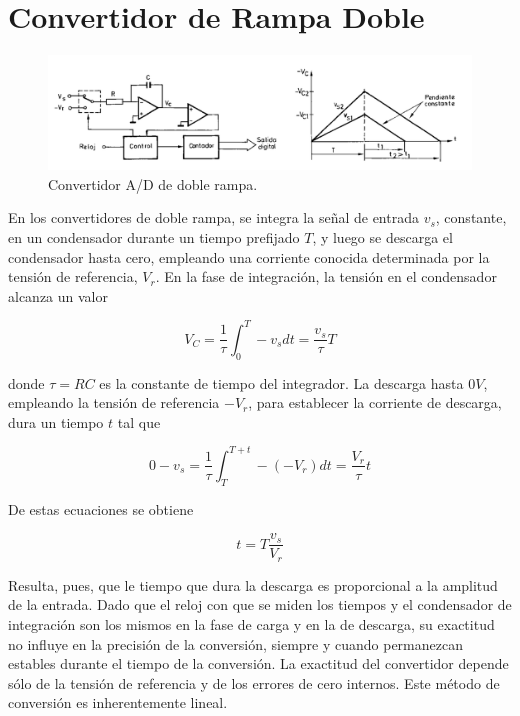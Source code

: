 \chapter{Convertidor de Rampa Doble}

\begin{figure}[H]
    \centering
    \includegraphics[width=0.75\linewidth]{Imagenes/Convertidor Doble Rampa.png}
    \caption{Convertidor A/D de doble rampa.}
\end{figure}

En los convertidores de doble rampa, se integra la señal de entrada $v_s$, constante, en un condensador durante un tiempo prefijado $T$, y luego se descarga el condensador hasta cero, empleando una corriente conocida determinada por la tensión de referencia, $V_r$. En la fase de integración, la tensión en el condensador alcanza un valor

\begin{equation}
    V_C = \frac{1}{\tau} \int_{0}^{T} - v_s dt = \frac{v_s}{\tau}T
\end{equation}

donde $\tau = R C$ es la constante de tiempo del integrador. La descarga hasta $0 V$, empleando la tensión de referencia $-V_r$, para establecer la corriente de descarga, dura un tiempo $t$ tal que

\begin{equation}
    0 - v_s = \frac{1}{\tau} \int_{T}^{T + t} -(-V_r)dt = \frac{V_r}{\tau} t
\end{equation}

De estas ecuaciones se obtiene

\begin{equation}
    t = T \frac{v_s}{V_r}
\end{equation}

Resulta, pues, que le tiempo que dura la descarga es proporcional a la amplitud de la entrada. Dado que el reloj con que se miden los tiempos y el condensador de integración son los mismos en la fase de carga y en la de descarga, su exactitud no influye en la precisión de la conversión, siempre y cuando permanezcan estables durante el tiempo de la conversión. La exactitud del convertidor depende sólo de la tensión de referencia y de los errores de cero internos. Este método de conversión es inherentemente lineal.
